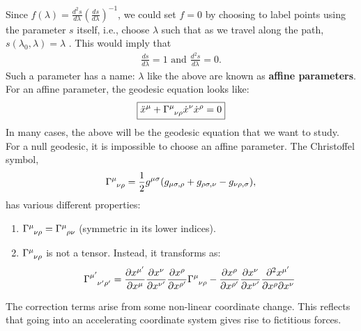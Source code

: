 \documentclass[11pt]{article}
\theoremstyle{definition}
\begin{document}
Since \( f (\lambda) = \frac{d^2s}{d \lambda} \left( \frac{ds}{d \lambda} \right)^{-1} \), we could set \( f = 0 \) by choosing to label points using the parameter \( s \) itself, i.e., choose \( \lambda \) such that as we travel along the path, \( s(\lambda_0, \lambda) = \lambda \) . This would imply that
\begin{align*}
	\frac{ds}{d \lambda} = 1 \text{ and } \frac{d^2s}{d \lambda} = 0.
\end{align*}
Such a parameter has a name: \( \lambda \) like the above are known as \textbf{affine parameters}. For an affine parameter, the geodesic equation looks like: 
\begin{align}
	\boxed{\ddot{x}^\mu + \tensor{\Gamma}{^\mu_{\nu \rho}} \dot{x}^\nu \dot{x}^\rho = 0  }	
\end{align}
In many cases, the above will be the geodesic equation that we want to study. For a null geodesic, it is impossible to choose an affine parameter. The Christoffel symbol, 
\begin{align*}
	\tensor{\Gamma}{^\mu_{\nu \rho}} = \frac{1}{2} g^{\mu \sigma} ( g_{\mu \sigma, \rho} + g_{\rho \sigma, \nu} - g_{\nu \rho, \sigma} ), 
\end{align*}
has various different properties: 
\begin{enumerate}[noitemsep]
	\item \( \tensor{\Gamma}{^\mu_{\nu \rho}} = \tensor{\Gamma}{^\mu_{\rho \nu}} \)  (symmetric in its lower indices). 
	\item \( \tensor{\Gamma}{^\mu_{\nu \rho}} \) is not a tensor. Instead, it transforms as: 
	\begin{align*}
		\tensor{\Gamma}{^{\mu'}_{\nu' \rho'}} = \frac{\partial x^{\mu'}}{\partial x^{\mu}} \frac{\partial x^{\nu}}{\partial x^{\nu'}} \frac{\partial x^\rho}{\partial x^{\rho'}} \tensor{\Gamma}{^\mu_{\nu \rho}} - \frac{\partial x^\rho}{\partial x^{\rho'}} \frac{\partial x^\nu}{\partial x^{\nu'}} \frac{\partial^2 x^{\mu'}}{\partial x^\rho \partial x^\nu}
	\end{align*}
\end{enumerate}
The correction terms arise from some non-linear coordinate change. This reflects that going into an accelerating coordinate system gives rise to fictitious forces.  
\end{document}
